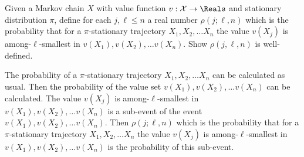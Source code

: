 \documentclass[12pt]{article}
\begin{document}
\begin{exercise}
    Given a Markov chain \( X \) with value function \( v:  \mathcal{X}
    \to \Reals \) and stationary distribution \( \pi \), define for each
    \( j, \ell \le n \) a real number \( \rho(j; \ell, n) \) which is
    the probability that for a \( \pi \)-stationary trajectory \( X_1, X_2,
    \dots X_n \) the value \( v(X_j) \) is among-\( \ell \)-smallest in \(
    v(X_1), v(X_2), \dots v(X_n) \).  Show \( \rho(j,\ell, n) \) is
    well-defined.
\end{exercise}
\begin{solution}
    The probability of a \( \pi \)-stationary trajectory \( X_1, X_2,
    \dots X_n \) can be calculated as usual.  Then the probability of
    the value set \( v(X_1), v(X_2), \dots v(X_n) \) can be calculated.
    The value \( v(X_j) \) is among-\( \ell \)-smallest in \( v(X_1), v(X_2),
    \dots v(X_n) \) is a sub-event of the event \( v(X_1), v(X_2), \dots
    v(X_n) \).  Then \( \rho(j; \ell, n) \) which is the probability
    that for a \( \pi \)-stationary trajectory \( X_1, X_2, \dots X_n \)
    the value \( v(X_j) \) is among-\( \ell \)-smallest in \( v(X_1), v(X_2),
    \dots v(X_n) \) is the probability of this sub-event.
\end{solution}
\end{document}
